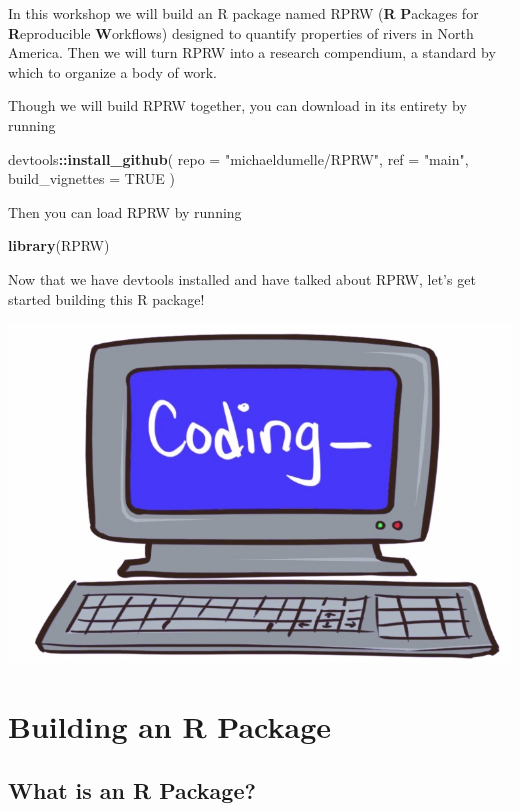 \documentclass[
]{book}
\newenvironment{Shaded}{\begin{snugshade}}{\end{snugshade}}
\newcommand{\DataTypeTok}[1]{\textcolor[rgb]{0.13,0.29,0.53}{#1}}
\newcommand{\KeywordTok}[1]{\textcolor[rgb]{0.13,0.29,0.53}{\textbf{#1}}}
\newcommand{\NormalTok}[1]{#1}
\newcommand{\OperatorTok}[1]{\textcolor[rgb]{0.81,0.36,0.00}{\textbf{#1}}}
\newcommand{\OtherTok}[1]{\textcolor[rgb]{0.56,0.35,0.01}{#1}}
\newcommand{\StringTok}[1]{\textcolor[rgb]{0.31,0.60,0.02}{#1}}
\begin{document}
In this workshop we will build an R package named RPRW (\textbf{R} \textbf{P}ackages for \textbf{R}eproducible \textbf{W}orkflows) designed to quantify properties of rivers in North America. Then we will turn RPRW into a research compendium, a standard by which to organize a body of work.

Though we will build RPRW together, you can download in its entirety by running

\begin{Shaded}
\begin{Highlighting}[]
\NormalTok{devtools}\OperatorTok{::}\KeywordTok{install_github}\NormalTok{(}
  \DataTypeTok{repo =} \StringTok{"michaeldumelle/RPRW"}\NormalTok{,}
  \DataTypeTok{ref =} \StringTok{"main"}\NormalTok{,}
  \DataTypeTok{build_vignettes =} \OtherTok{TRUE}
\NormalTok{)}
\end{Highlighting}
\end{Shaded}

Then you can load RPRW by running

\begin{Shaded}
\begin{Highlighting}[]
\KeywordTok{library}\NormalTok{(RPRW)}
\end{Highlighting}
\end{Shaded}

Now that we have devtools installed and have talked about RPRW, let's get started building this R package!

\begin{center}\includegraphics[width=0.5\linewidth]{images/coding} \end{center}

\hypertarget{r-package}{%
\chapter{Building an R Package}\label{r-package}}

\hypertarget{what-is-an-r-package}{%
\section{What is an R Package?}\label{what-is-an-r-package}}
\end{document}
